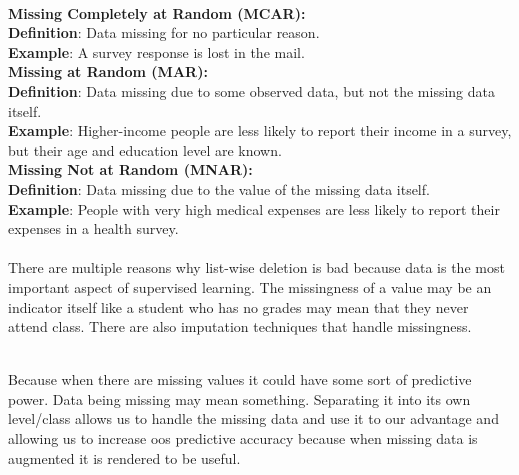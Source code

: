\documentclass[12pt]{article}
\begin{document}
\newpage
{}

\begin{enumerate}
 \\ 

\textbf{Missing Completely at Random (MCAR):}  \\
\textbf{Definition}: Data missing for no particular reason.\\
\textbf{Example}: A survey response is lost in the mail. \\ 

\textbf{Missing at Random (MAR):} \\
\textbf{Definition}: Data missing due to some observed data, but not the missing data itself.\\
\textbf{Example}: Higher-income people are less likely to report their income in a survey, but their age and education level are known. \\ 

\textbf{Missing Not at Random (MNAR):} \\
\textbf{Definition}: Data missing due to the value of the missing data itself. \\
\textbf{Example}: People with very high medical expenses are less likely to report their expenses in a health survey. \\

 \\ 
There are multiple reasons why list-wise deletion is bad because data is the most important aspect of supervised learning. The missingness of a value may be an indicator itself like a student who has no grades may mean that they never attend class. There are also imputation techniques that handle missingness. 

 \\ 
Because when there are missing values it could have some sort of predictive power. Data being missing may mean something. Separating it into its own level/class allows us to handle the missing data and use it to our advantage and allowing us to increase oos predictive accuracy because when missing data is augmented it is rendered to be useful. 


\end{enumerate}
\end{document}
